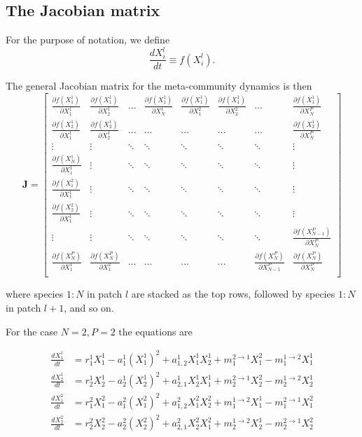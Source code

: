 \documentclass[12pt]{article}
\begin{document}
\subsection*{The Jacobian matrix}
For the purpose of notation, we define
\[ \frac{dX_{i}^{l}}{dt} \equiv f(X_{i}^{l}). \]

The general Jacobian matrix for the meta-community dynamics is then
\[ \mathbf{J} = \begin{bmatrix}
    \frac{\partial f(X_1^1)}{\partial X_1^1} & \frac{\partial f(X_1^1)}{\partial X_2^1} & \dots & \frac{\partial f(X_1^1)}{\partial X_N^1}  &  \frac{\partial f(X_1^1)}{\partial X_1^2} & \frac{\partial f(X_1^1)}{\partial X_2^2} & \dots & \frac{\partial f(X_1^1)}{\partial X_N^{P}} \\ 
    \frac{\partial f(X_2^1)}{\partial X_1^1} &  \frac{\partial f(X_2^1)}{\partial X_2^1} & \dots & \dots & \dots & \dots & \dots & \frac{\partial f(X_2^1)}{\partial X_N^P} \\
    \vdots    & \vdots & \ddots  & \ddots & \ddots & \ddots & \ddots & \vdots\\
    \frac{\partial f(X_N^1)}{\partial X_1^1} & \vdots   & \ddots  & \ddots & \ddots & \ddots & \ddots & \vdots \\
    \frac{\partial f(X_1^2)}{\partial X_1^1} & \vdots & \ddots  & \ddots & \ddots & \ddots & \ddots & \vdots \\
    \frac{\partial f(X_2^2)}{\partial X_1^1} & \vdots & \ddots  & \ddots & \ddots & \ddots & \ddots & \vdots\\
    \vdots   & \vdots & \ddots  & \ddots & \ddots & \ddots & \ddots & \frac{\partial f(X_{N-1}^P)}{\partial X_N^P}\\
    \frac{\partial f(X_N^P)}{\partial X_1^1} & \frac{\partial f(X_N^P)}{\partial X_1^2} & \dots & \dots & \dots & \dots & \frac{\partial f(X_N^P)}{\partial X_{N-1}^P} & \frac{\partial f(X_N^P)}{\partial X_N^P} \\    
\end{bmatrix} \]

where species $1:N$ in patch $l$ are stacked as the top rows, followed by species $1:N$ in patch $l+1$, and so on. 

For the case $N = 2, P=2$ the equations are

\begin{align*}
\frac{dX_1^1}{dt} &=  r_1^1 X_1^1 - a_1^1(X_1^1)^2 +  a_{1,2}^1X_1^1X_2^1 + m_1^{2\rightarrow 1} X_1^2 - m_1^{1\rightarrow 2} X_1^1\\
\frac{dX_2^1}{dt} &=  r_2^1 X_2^1 - a_2^1 (X_2^1)^2 + a_{2,1}^1X_2^1X_1^1  + m_2^{2\rightarrow 1} X_2^2 - m_2^{1\rightarrow 2}X_2^1\\
\frac{dX_1^2}{dt} &=  r_1^2 X_1^2 - a_1^2 (X_1^2)^2 + a_{1,2}^2X_1^2X_2^2 + m_1^{1\rightarrow 2}X_1^1 - m_1^{2\rightarrow 1}X_1^2 \\
\frac{dX_2^2}{dt} &=  r_2^2 X_2^2 - a_2^2 (X_2^2)^2  + a_{2,1}^2X_2^2X_1^2 + m_2^{1\rightarrow 2} X_2^1 - m_2^{2\rightarrow 1} X_2^2\\
\end{align*}
\end{document}
